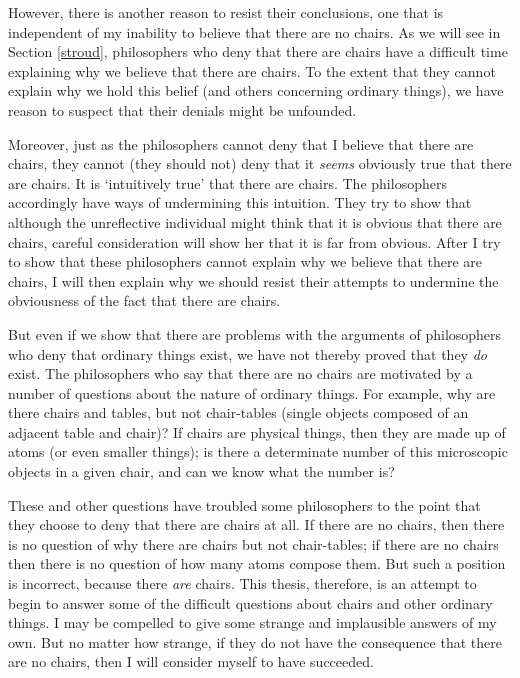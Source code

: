 \documentclass[11pt]{article}
\begin{document}
\begin{spacing}{1.25}
However, there is another reason to resist their conclusions, one that
is independent of my inability to believe that there are no chairs.
As we will see in Section \ref{stroud}, philosophers who deny that
there are chairs have a difficult time explaining why we believe that
there are chairs.  To the extent that they cannot explain why we hold
this belief (and others concerning ordinary things), we have reason to
suspect that their denials might be unfounded.

Moreover, just as the philosophers cannot deny that I believe that
there are chairs, they cannot (they should not) deny that it {\em
  seems} obviously true that there are chairs.  It is `intuitively
true' that there are chairs.  The philosophers accordingly have ways
of undermining this intuition.  They try to show that although the
unreflective individual might think that it is obvious that there are
chairs, careful consideration will show her that it is far from
obvious.  After I try to show that these philosophers cannot explain
why we believe that there are chairs, I will then explain why we
should resist their attempts to undermine the obviousness of the fact
that there are chairs.

But even if we show that there are problems with the arguments of
philosophers who deny that ordinary things exist, we have not thereby
proved that they {\em do} exist.  The philosophers who say that there
are no chairs are motivated by a number of questions about the nature
of ordinary things.  For example, why are there chairs and tables, but
not chair-tables (single objects composed of an adjacent table and
chair)?  If chairs are physical things, then they are made up of atoms
(or even smaller things); is there a determinate number of this
microscopic objects in a given chair, and can we know what the number
is?

These and other questions have troubled some philosophers to the point
that they choose to deny that there are chairs at all.  If there are
no chairs, then there is no question of why there are chairs but not
chair-tables; if there are no chairs then there is no question of how
many atoms compose them.  But such a position is incorrect, because
there {\em are} chairs.  This thesis, therefore, is an attempt to
begin to answer some of the difficult questions about chairs and other
ordinary things.  I may be compelled to give some strange and
implausible answers of my own.  But no matter how strange, if they do
not have the consequence that there are no chairs, then I will
consider myself to have succeeded.

\ifstandalone
\end{spacing}


\fi
\end{document}
